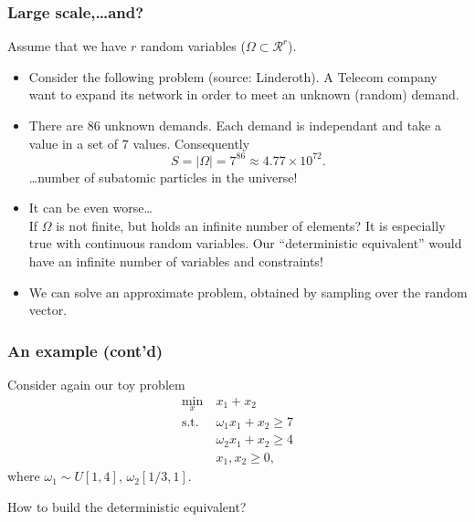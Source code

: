 \documentclass{beamer}
\def\rit{\mathcal{R}}
\begin{document}
\begin{frame}
	\frametitle{Large scale,\ldots and?}
	
	Assume that we have $r$ random variables ($\Omega \subset
	\rit^r$).
	\begin{itemize}
		\item
		Consider the following problem (source: Linderoth).
		A Telecom company want to expand its network in order to meet an unknown (random) demand.
		\item
		There are 86 unknown demands.
		Each demand is independant and take a value in a set of 7 values.
		Consequently
		\[
		S = |\Omega| = 7^{86} \approx 4.77\times10^{72}.
		\]
		\ldots number of subatomic particles in the universe!
		\item
		It can be even worse\ldots\\
		If $\Omega$ is not finite, but holds an infinite number of elements?
		It is especially true with continuous random variables.
		Our ``deterministic equivalent'' would have an infinite number of variables and constraints!
		\item
		We can solve an approximate problem, obtained by sampling over the random vector.
	\end{itemize}
\end{frame}

\begin{frame}
	\frametitle{An example (cont'd)}
	
	Consider again our toy problem
	\begin{align*}
	\min_x\ & x_1+x_2\\
	\mbox{s.t. } & \omega_1x_1 + x_2 \geq 7 \\
	& \omega_2x_1 + x_2 \geq 4 \\
	& x_1, x_2 \geq 0,
	\end{align*}
	where $\omega_1 \sim U[1,4]$, $\omega_2[1/3,1]$.
	
	\mbox{}
	
	How to build the deterministic equivalent?
	
\end{frame}
\end{document}
